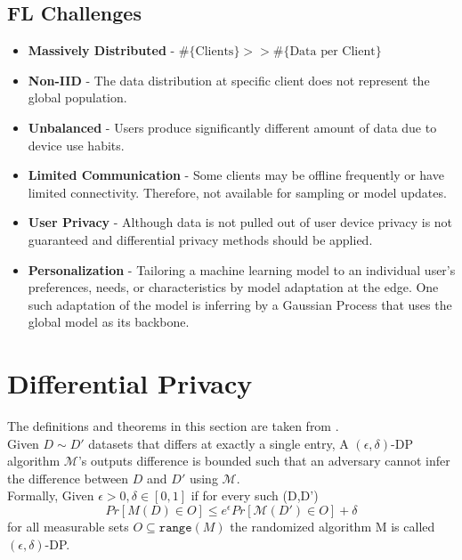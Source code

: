 \documentclass[fourier]{_style/dissertation}
\begin{document}
\subsection{FL Challenges}
\begin{itemize}
    \item \textbf{Massively Distributed} - $\# \{ \text{Clients} \} > >  \# \{ \text{Data per Client} \}$
    \item \textbf{Non-IID} - The data distribution at specific client does not represent the global population.
    \item \textbf{Unbalanced} - Users produce significantly different amount of data due to device use habits.
    \item \textbf{Limited Communication} - Some clients may be offline frequently or have limited connectivity. Therefore, not available for sampling or model updates.               
    \item \textbf{User Privacy} - Although data is not pulled out of user device privacy is not guaranteed and differential privacy methods should be applied.
    \item \textbf{Personalization} - Tailoring a machine learning model to an individual user's preferences, needs, or characteristics by model adaptation at the edge. One such adaptation of the model is inferring by a Gaussian Process that uses the global model as its backbone.
\end{itemize}

\section{Differential Privacy}
The definitions and theorems in this section are taken from \cite{Dwork2014ThePrivacy}. \\
Given $D \sim D'$ datasets that differs at exactly a single entry, A $(\epsilon,\delta)$-DP algorithm $\mathcal{M}$'s outputs difference is bounded such that an adversary cannot infer the difference between $D$ and $D'$ using  $\mathcal{M}$. \\
Formally, Given $\epsilon>0, \delta \in [0,1]$ if for every such (D,D')  
$$  Pr[M(D) \in O] \leq e^{\epsilon}Pr[\mathcal{M}(D') \in O]+ \delta$$ for all measurable sets $O \subseteq \texttt{range}(M)$ the randomized algorithm M is called $(\epsilon,\delta)$-DP. \\
\end{document}

